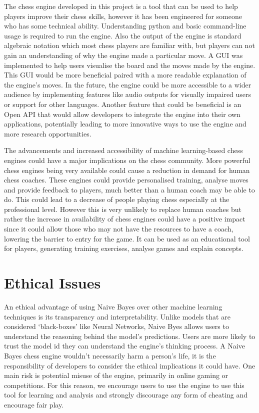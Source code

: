 The chess engine developed in this project is a tool that can be used to help players improve their chess skills, however it has been engineered for someone who has some technical ability. Understanding python and basic command-line usage is required to run the engine. Also the output of the engine is standard algebraic notation which most chess players are familiar with, but players can not gain an understanding of why the engine made a particular move. A GUI was implemented to help users visualise the board and the moves made by the engine. This GUI would be more beneficial paired with a more readable explanation of the engine's moves. In the future, the engine could be more accessible to a wider audience by implementing features like audio outputs for visually impaired users or support for other languages. Another feature that could be beneficial is an Open API that would allow developers to integrate the engine into their own applications, potentially leading to more innovative ways to use the engine and more research opportunities. 

The advancements and increased accessibility of machine learning-based chess engines could have a major implications on the chess community. More powerful chess engines being very available could cause a reduction in demand for human chess coaches. These engines could provide personalised training, analyse moves and provide feedback to players, much better than a human coach may be able to do. This could lead to a decrease of people playing chess especially at the professional level. However this is very unlikely to replace human coaches but rather the increase in availability of chess engines could have a positive impact since it could allow those who may not have the resources to have a coach, lowering the barrier to entry for the game. It can be used as an educational tool for players, generating training exercises, analyse games and explain concepts.

\section{Ethical Issues}

An ethical advantage of using Naive Bayes over other machine learning techniques is its transparency and interpretability. Unlike models that are considered `black-boxes' like Neural Networks, Naive Byes allows users to understand the reasoning behind the model's predictions. Users are more likely to trust the model id they can understand the engine's thinking process. A Naive Bayes chess engine wouldn't necessarily harm a person's life, it is the responsibility of developers to consider the ethical implications it could have. One main risk is potential misuse of the engine, primarily in online gaming or competitions. For this reason, we encourage users to use the engine to use this tool for learning and analysis and strongly discourage any form of cheating and encourage fair play.

